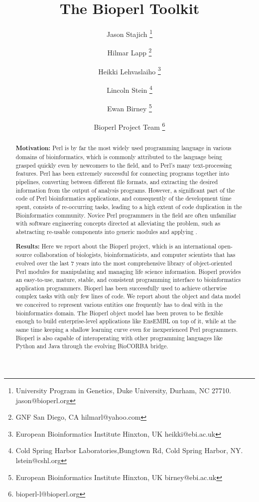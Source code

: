 \documentclass[twocolumn]{article}
\begin{document}
\title{The Bioperl Toolkit}
\author{Jason Stajich \thanks{University Program in Genetics, 	
	Duke University, Durham, NC 27710. jason@bioperl.org } \and 
Hilmar Lapp \thanks{GNF San Diego, CA hilmarl@yahoo.com } \and 
Heikki Lehvaslaiho \thanks{European Bioinformatics Institute Hinxton,
	UK heikki@ebi.ac.uk } \and 
Lincoln Stein \thanks{Cold Spring Harbor Laboratories,Bungtown Rd,
	Cold Spring Harbor, NY. lstein@cshl.org} \and
Ewan Birney \thanks{European Bioinformatics Institute Hinxton, UK
	birney@ebi.ac.uk } \and 
Bioperl Project Team \thanks{bioperl-l@bioperl.org}
}
\maketitle

\begin{abstract}

\textbf{Motivation:} Perl is by far the most widely used programming
language in various domains of bioinformatics, which is commonly
attributed to the language being grasped quickly even by newcomers to
the field, and to Perl's many text-processing features.  Perl has been
extremely successful for connecting programs together into pipelines, 
converting between different file formats, and extracting the
desired information from the output of analysis programs.  However, a
significant part of the code of Perl bioinformatics applications, and
consequently of the development time spent, consists of re-occurring
tasks, leading to a high extent of code duplication in the
Bioinformatics community.  Novice Perl programmers in the field are often
unfamiliar with software engineering concepts directed at alleviating
the problem, such as abstracting re-usable components into generic
modules and applying .

\textbf{Results:} Here we report about the Bioperl project, which is
an international open-source collaboration of biologists,
bioinformaticists, and computer scientists that has evolved over the
last 7 years into the most comprehensive library of object-oriented
Perl modules for manipulating and managing life science information.
Bioperl provides an easy-to-use, mature, stable, and consistent
programming interface to bioinformatics application programmers.
Bioperl has been successfully used to achieve otherwise complex tasks
with only few lines of code.  We report about the object and data
model we conceived to represent various entities one frequently has to
deal with in the bioinformatics domain.  The Bioperl object model has
been proven to be flexible enough to build enterprise-level
applications like EnsEMBL \cite{ensembl-nar} on top of it, while at the
same time keeping a shallow learning curve even for inexperienced Perl
programmers.  Bioperl is also capable of interoperating with other
programming languages like Python and Java through the evolving
BioCORBA bridge.


\end{abstract}
\end{document}
